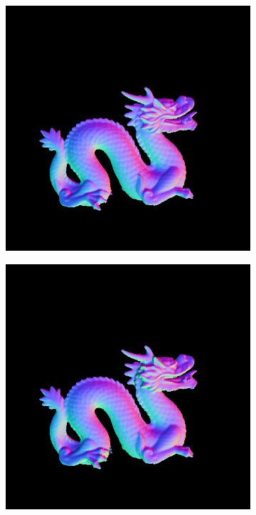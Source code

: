 \documentclass[border=15pt, multi, tikz]{article}
\begin{document}
\begin{figure}[H]
	\centering
	\begin{subfigure}[b]{0.24\linewidth}
		\includegraphics[width=\linewidth]{./Figures/comparison/fancy_eval_22_groundtruth.png}
	\end{subfigure}
	\begin{subfigure}[b]{0.24\linewidth}
		\includegraphics[width=\linewidth]{./Figures/comparison/fancy_eval_22_normal_SVD.png}

\end{subfigure}
\end{figure}
\end{document}
